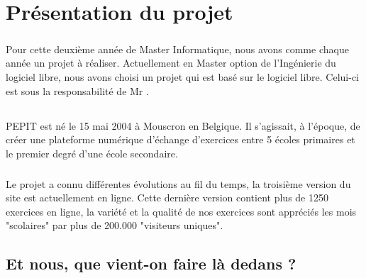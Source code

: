 \documentclass[french]{report}
\begin{document}
\tableofcontents




\chapter{Présentation du projet}
\paragraph{}Pour cette deuxième année de Master Informatique, nous avons comme chaque année un projet à réaliser. Actuellement en Master option de l'Ingénierie du logiciel libre, nous avons choisi un projet qui est basé sur le logiciel libre. Celui-ci est sous la responsabilité de Mr \responsableProjet.

\section{\pepit}
\paragraph{}PEPIT est né le 15 mai 2004 à Mouscron en Belgique. Il s'agissait, à l'époque, de créer une plateforme numérique d'échange d'exercices entre 5 écoles primaires et le premier degré d'une école secondaire.

\paragraph{}Le projet a connu différentes évolutions au fil du temps, la troisième version du site est actuellement en ligne. Cette dernière version contient plus de 1250 exercices en ligne, la variété et la qualité de nos exercices sont appréciés les mois "scolaires" par plus de 200.000 "visiteurs uniques".

\section{Et nous, que vient-on faire là dedans ?}
\end{document}
